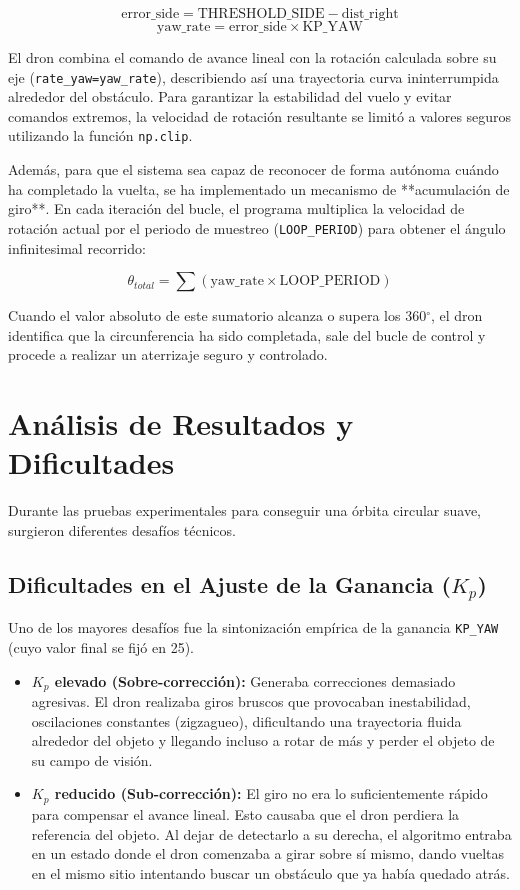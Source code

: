 \documentclass[12pt,a4paper]{article}
\begin{document}
\begin{equation}
    \text{error\_side} = \text{THRESHOLD\_SIDE} - \text{dist\_right}
\end{equation}
\begin{equation}
    \text{yaw\_rate} = \text{error\_side} \times \text{KP\_YAW}
\end{equation}

El dron combina el comando de avance lineal con la rotación calculada sobre su eje (\texttt{rate\_yaw=yaw\_rate}), describiendo así una trayectoria curva ininterrumpida alrededor del obstáculo. Para garantizar la estabilidad del vuelo y evitar comandos extremos, la velocidad de rotación resultante se limitó a valores seguros utilizando la función \texttt{np.clip}.

Además, para que el sistema sea capaz de reconocer de forma autónoma cuándo ha completado la vuelta, se ha implementado un mecanismo de **acumulación de giro**. En cada iteración del bucle, el programa multiplica la velocidad de rotación actual por el periodo de muestreo (\texttt{LOOP\_PERIOD}) para obtener el ángulo infinitesimal recorrido:

\begin{equation}
    \theta_{total} = \sum (\text{yaw\_rate} \times \text{LOOP\_PERIOD})
\end{equation}

Cuando el valor absoluto de este sumatorio alcanza o supera los 360$^\circ$, el dron identifica que la circunferencia ha sido completada, sale del bucle de control y procede a realizar un aterrizaje seguro y controlado.

\section{Análisis de Resultados y Dificultades}
Durante las pruebas experimentales para conseguir una órbita circular suave, surgieron diferentes desafíos técnicos.

\subsection{Dificultades en el Ajuste de la Ganancia ($K_p$)}
Uno de los mayores desafíos fue la sintonización empírica de la ganancia \texttt{KP\_YAW} (cuyo valor final se fijó en 25).
\begin{itemize}
    \item \textbf{$K_p$ elevado (Sobre-corrección):} Generaba correcciones demasiado agresivas. El dron realizaba giros bruscos que provocaban inestabilidad, oscilaciones constantes (zigzagueo), dificultando una trayectoria fluida alrededor del objeto y llegando incluso a rotar de más y perder el objeto de su campo de visión.
    \item \textbf{$K_p$ reducido (Sub-corrección):} El giro no era lo suficientemente rápido para compensar el avance lineal. Esto causaba que el dron perdiera la referencia del objeto. Al dejar de detectarlo a su derecha, el algoritmo entraba en un estado donde el dron comenzaba a girar sobre sí mismo, dando vueltas en el mismo sitio intentando buscar un obstáculo que ya había quedado atrás.
\end{itemize}
\end{document}

